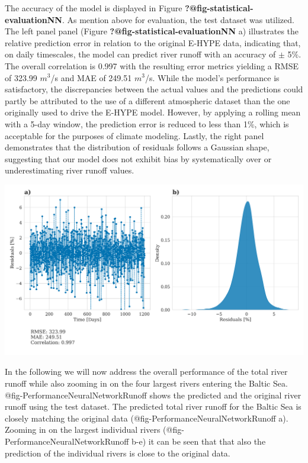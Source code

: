 \documentclass[
]{agujournal2019}
\begin{document}
The accuracy of the model is displayed in Figure
\textbf{?@fig-statistical-evaluationNN}. As mention above for
evaluation, the test dataset was utilized. The left panel panel (Figure
\textbf{?@fig-statistical-evaluationNN} a) illustrates the relative
prediction error in relation to the original E-HYPE data, indicating
that, on daily timescales, the model can predict river runoff with an
accuracy of \(\pm\) 5\(\%\). The overall correlation is 0.997 with the
resulting error metrics yielding a RMSE of 323.99 \(m^3\)/s and MAE of
249.51 \(m^3\)/s. While the model's performance is satisfactory, the
discrepancies between the actual values and the predictions could partly
be attributed to the use of a different atmospheric dataset than the one
originally used to drive the E-HYPE model. However, by applying a
rolling mean with a 5-day window, the prediction error is reduced to
less than 1\(\%\), which is acceptable for the purposes of climate
modeling. Lastly, the right panel demonstrates that the distribution of
residuals follows a Gaussian shape, suggesting that our model does not
exhibit bias by systematically over or underestimating river runoff
values.

\includegraphics{../src/figures/paper_error_metrics.png}

In the following we will now address the overall performance of the
total river runoff while also zooming in on the four largest rivers
entering the Baltic Sea. @fig-PerformanceNeuralNetworkRunoff shows the
predicted and the original river runoff using the test dataset. The
predicted total river runoff for the Baltic Sea is closely matching the
original data (@fig-PerformanceNeuralNetworkRunoff a). Zooming in on the
largest individual rivers (@fig-PerformanceNeuralNetworkRunoff b-e) it
can be seen that that also the prediction of the individual rivers is
close to the original data.
\end{document}
